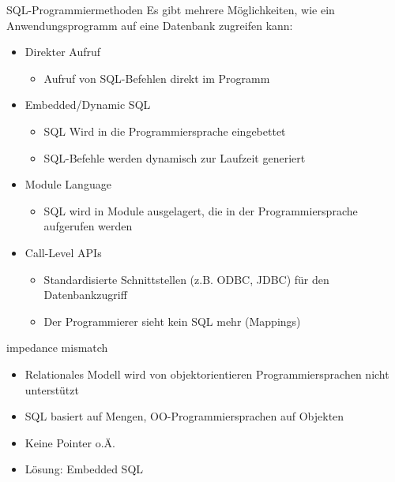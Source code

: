 \documentclass{article}
\begin{document}
\begin{block}{SQL-Programmiermethoden}
  Es gibt mehrere Möglichkeiten, wie ein Anwendungsprogramm auf eine Datenbank zugreifen kann:
  \begin{itemize}
    \item Direkter Aufruf
    \begin{itemize}
      \item Aufruf von SQL-Befehlen direkt im Programm
    \end{itemize}
    \item Embedded/Dynamic SQL
    \begin{itemize}
      \item SQL Wird in die Programmiersprache eingebettet
      \item SQL-Befehle werden dynamisch zur Laufzeit generiert
    \end{itemize}
    \item Module Language
    \begin{itemize}
      \item SQL wird in Module ausgelagert, die in der Programmiersprache aufgerufen werden
    \end{itemize}
    \item Call-Level APIs
    \begin{itemize}
      \item Standardisierte Schnittstellen (z.B. ODBC, JDBC) für den Datenbankzugriff
      \item Der Programmierer sieht kein SQL mehr (Mappings)
    \end{itemize}
  \end{itemize}
\end{block}

\begin{block}{impedance mismatch}
  \begin{itemize}
    \item Relationales Modell wird von objektorientieren Programmiersprachen nicht unterstützt
    \item SQL basiert auf Mengen, OO-Programmiersprachen auf Objekten
    \item Keine Pointer o.Ä.
    \item Lösung: Embedded SQL
  \end{itemize}
\end{block}
\end{document}

